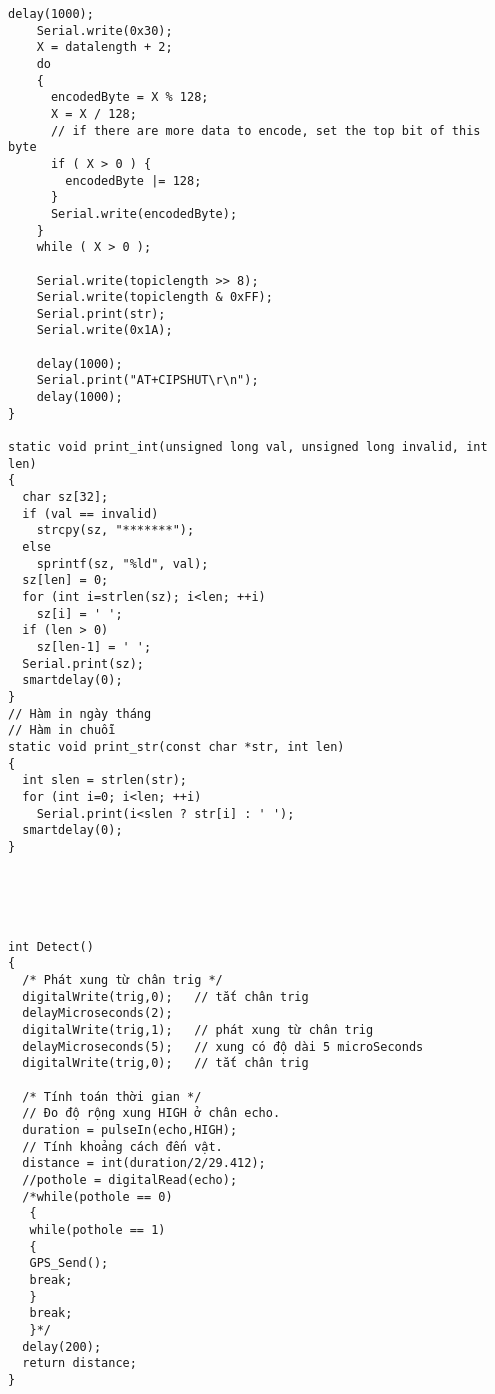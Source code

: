 \documentclass[12pt]{article} %
\begin{document}
\begin{lstlisting}[style=myArduino]
    delay(1000);
    Serial.write(0x30);
    X = datalength + 2;
    do
    {
      encodedByte = X % 128;
      X = X / 128;
      // if there are more data to encode, set the top bit of this byte
      if ( X > 0 ) {
        encodedByte |= 128;
      }
      Serial.write(encodedByte);
    }
    while ( X > 0 );

    Serial.write(topiclength >> 8);
    Serial.write(topiclength & 0xFF);
    Serial.print(str);
    Serial.write(0x1A);
    
    delay(1000);
    Serial.print("AT+CIPSHUT\r\n");
    delay(1000);
}

static void print_int(unsigned long val, unsigned long invalid, int len)
{
  char sz[32];
  if (val == invalid)
    strcpy(sz, "*******");
  else
    sprintf(sz, "%ld", val);
  sz[len] = 0;
  for (int i=strlen(sz); i<len; ++i)
    sz[i] = ' ';
  if (len > 0) 
    sz[len-1] = ' ';
  Serial.print(sz);
  smartdelay(0);
}
// Hàm in ngày tháng
// Hàm in chuỗi
static void print_str(const char *str, int len)
{
  int slen = strlen(str);
  for (int i=0; i<len; ++i)
    Serial.print(i<slen ? str[i] : ' ');
  smartdelay(0);
}





int Detect()
{
  /* Phát xung từ chân trig */
  digitalWrite(trig,0);   // tắt chân trig
  delayMicroseconds(2);
  digitalWrite(trig,1);   // phát xung từ chân trig
  delayMicroseconds(5);   // xung có độ dài 5 microSeconds
  digitalWrite(trig,0);   // tắt chân trig

  /* Tính toán thời gian */
  // Đo độ rộng xung HIGH ở chân echo. 
  duration = pulseIn(echo,HIGH);  
  // Tính khoảng cách đến vật.
  distance = int(duration/2/29.412);
  //pothole = digitalRead(echo);
  /*while(pothole == 0)
   {
   while(pothole == 1)
   {
   GPS_Send();
   break;
   }
   break;
   }*/
  delay(200);
  return distance;
}


\end{lstlisting}
\end{document}
